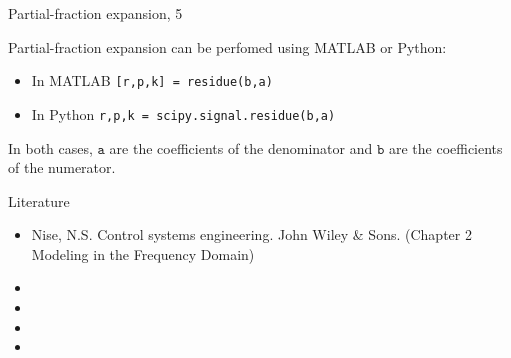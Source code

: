 \documentclass{beamer}
\begin{document}
\begin{frame}{Partial-fraction expansion, 5}
	\begin{flushleft}
		
		Partial-fraction expansion can be perfomed using MATLAB or Python:
		
		\bigskip
		
		\begin{itemize}
			\item In MATLAB \texttt{[r,p,k] = residue(b,a)}
				
			\item In Python \texttt{r,p,k = scipy.signal.residue(b,a)}
		\end{itemize}
		
		\bigskip
		
		In both cases, $\texttt{a}$ are the coefficients of the denominator and $\texttt{b}$ are the coefficients of the numerator. 
		
	\end{flushleft}
\end{frame}





\begin{frame}{Literature}

\begin{itemize}
	
	
	\item Nise, N.S. Control systems engineering. John Wiley \& Sons. (Chapter 2 Modeling in the Frequency Domain)	
	
	\item {}	
	
\item {}

\item {}

\item {}

\end{itemize}

\end{frame}



\myqrframe
\end{document}
